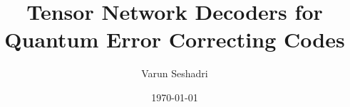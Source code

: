 \documentclass[11pt, twoside]{report}
\theoremstyle{definition}
\begin{document}
\begin{titlepage}
    \title{Tensor Network Decoders for Quantum Error Correcting Codes}
    \author{Varun Seshadri}
    \date{\today}
\end{titlepage}
\maketitle
% 

\newpage
\tableofcontents
\listoftodos{}







\newpage
\nocite{*}
\printbibliography[title=\refname]

\restoregeometry
\newpage


\end{document}
